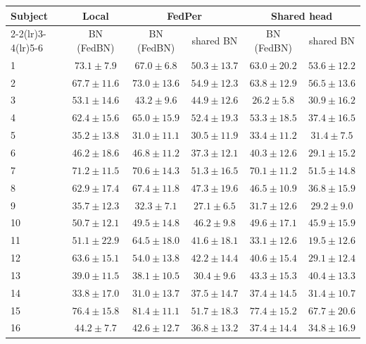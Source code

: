 \begin{tabular}{lccccc}
\toprule
Subject & \multicolumn{1}{c}{Local} & \multicolumn{2}{c}{FedPer} & \multicolumn{2}{c}{Shared head} \\
\cmidrule(lr){2-2}\cmidrule(lr){3-4}\cmidrule(lr){5-6}
 & BN (FedBN) & BN (FedBN) & shared BN & BN (FedBN) & shared BN \\
\midrule
1 & $\mathbf{73.1} \pm 7.9$ & $67.0 \pm 6.8$ & $50.3 \pm 13.7$ & $63.0 \pm 20.2$ & $53.6 \pm 12.2$ \\
2 & $67.7 \pm 11.6$ & $\mathbf{73.0} \pm 13.6$ & $54.9 \pm 12.3$ & $63.8 \pm 12.9$ & $56.5 \pm 13.6$ \\
3 & $\mathbf{53.1} \pm 14.6$ & $43.2 \pm 9.6$ & $44.9 \pm 12.6$ & $26.2 \pm 5.8$ & $30.9 \pm 16.2$ \\
4 & $62.4 \pm 15.6$ & $\mathbf{65.0} \pm 15.9$ & $52.4 \pm 19.3$ & $53.3 \pm 18.5$ & $37.4 \pm 16.5$ \\
5 & $\mathbf{35.2} \pm 13.8$ & $31.0 \pm 11.1$ & $30.5 \pm 11.9$ & $33.4 \pm 11.2$ & $31.4 \pm 7.5$ \\
6 & $46.2 \pm 18.6$ & $\mathbf{46.8} \pm 11.2$ & $37.3 \pm 12.1$ & $40.3 \pm 12.6$ & $29.1 \pm 15.2$ \\
7 & $\mathbf{71.2} \pm 11.5$ & $70.6 \pm 14.3$ & $51.3 \pm 16.5$ & $70.1 \pm 11.2$ & $51.5 \pm 14.8$ \\
8 & $62.9 \pm 17.4$ & $\mathbf{67.4} \pm 11.8$ & $47.3 \pm 19.6$ & $46.5 \pm 10.9$ & $36.8 \pm 15.9$ \\
9 & $\mathbf{35.7} \pm 12.3$ & $32.3 \pm 7.1$ & $27.1 \pm 6.5$ & $31.7 \pm 12.6$ & $29.2 \pm 9.0$ \\
10 & $\mathbf{50.7} \pm 12.1$ & $49.5 \pm 14.8$ & $46.2 \pm 9.8$ & $49.6 \pm 17.1$ & $45.9 \pm 15.9$ \\
11 & $51.1 \pm 22.9$ & $\mathbf{64.5} \pm 18.0$ & $41.6 \pm 18.1$ & $33.1 \pm 12.6$ & $19.5 \pm 12.6$ \\
12 & $\mathbf{63.6} \pm 15.1$ & $54.0 \pm 13.8$ & $42.2 \pm 14.4$ & $40.6 \pm 15.4$ & $29.1 \pm 12.4$ \\
13 & $39.0 \pm 11.5$ & $38.1 \pm 10.5$ & $30.4 \pm 9.6$ & $\mathbf{43.3} \pm 15.3$ & $40.4 \pm 13.3$ \\
14 & $33.8 \pm 17.0$ & $31.0 \pm 13.7$ & $\mathbf{37.5} \pm 14.7$ & $37.4 \pm 14.5$ & $31.4 \pm 10.7$ \\
15 & $76.4 \pm 15.8$ & $\mathbf{81.4} \pm 11.1$ & $51.7 \pm 18.3$ & $77.4 \pm 15.2$ & $67.7 \pm 20.6$ \\
16 & $\mathbf{44.2} \pm 7.7$ & $42.6 \pm 12.7$ & $36.8 \pm 13.2$ & $37.4 \pm 14.4$ & $34.8 \pm 16.9$ \\

\end{tabular}
